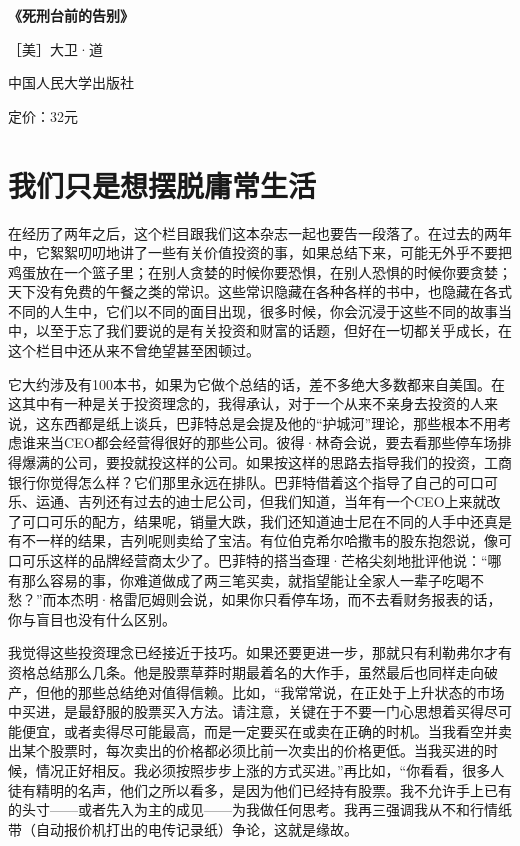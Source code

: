 \textbf{《死刑台前的告别》}

［美］大卫·道

中国人民大学出版社

定价：32元

\hypertarget{ux6211ux4eecux53eaux662fux60f3ux6446ux8131ux5eb8ux5e38ux751fux6d3b}{%
\section{我们只是想摆脱庸常生活}\label{ux6211ux4eecux53eaux662fux60f3ux6446ux8131ux5eb8ux5e38ux751fux6d3b}}

在经历了两年之后，这个栏目跟我们这本杂志一起也要告一段落了。在过去的两年中，它絮絮叨叨地讲了一些有关价值投资的事，如果总结下来，可能无外乎不要把鸡蛋放在一个篮子里；在别人贪婪的时候你要恐惧，在别人恐惧的时候你要贪婪；天下没有免费的午餐之类的常识。这些常识隐藏在各种各样的书中，也隐藏在各式不同的人生中，它们以不同的面目出现，很多时候，你会沉浸于这些不同的故事当中，以至于忘了我们要说的是有关投资和财富的话题，但好在一切都关乎成长，在这个栏目中还从来不曾绝望甚至困顿过。

它大约涉及有100本书，如果为它做个总结的话，差不多绝大多数都来自美国。在这其中有一种是关于投资理念的，我得承认，对于一个从来不亲身去投资的人来说，这东西都是纸上谈兵，巴菲特总是会提及他的``护城河''理论，那些根本不用考虑谁来当CEO都会经营得很好的那些公司。彼得·林奇会说，要去看那些停车场排得爆满的公司，要投就投这样的公司。如果按这样的思路去指导我们的投资，工商银行你觉得怎么样？它们那里永远在排队。巴菲特借着这个指导了自己的可口可乐、运通、吉列还有过去的迪士尼公司，但我们知道，当年有一个CEO上来就改了可口可乐的配方，结果呢，销量大跌，我们还知道迪士尼在不同的人手中还真是有不一样的结果，吉列呢则卖给了宝洁。有位伯克希尔哈撒韦的股东抱怨说，像可口可乐这样的品牌经营商太少了。巴菲特的搭当查理·芒格尖刻地批评他说：``哪有那么容易的事，你难道做成了两三笔买卖，就指望能让全家人一辈子吃喝不愁？''而本杰明·格雷厄姆则会说，如果你只看停车场，而不去看财务报表的话，你与盲目也没有什么区别。

我觉得这些投资理念已经接近于技巧。如果还要更进一步，那就只有利勒弗尔才有资格总结那么几条。他是股票草莽时期最着名的大作手，虽然最后也同样走向破产，但他的那些总结绝对值得信赖。比如，``我常常说，在正处于上升状态的市场中买进，是最舒服的股票买入方法。请注意，关键在于不要一门心思想着买得尽可能便宜，或者卖得尽可能最高，而是一定要买在或卖在正确的时机。当我看空并卖出某个股票时，每次卖出的价格都必须比前一次卖出的价格更低。当我买进的时候，情况正好相反。我必须按照步步上涨的方式买进。''再比如，``你看看，很多人徒有精明的名声，他们之所以看多，是因为他们已经持有股票。我不允许手上已有的头寸------或者先入为主的成见------为我做任何思考。我再三强调我从不和行情纸带（自动报价机打出的电传记录纸）争论，这就是缘故。

